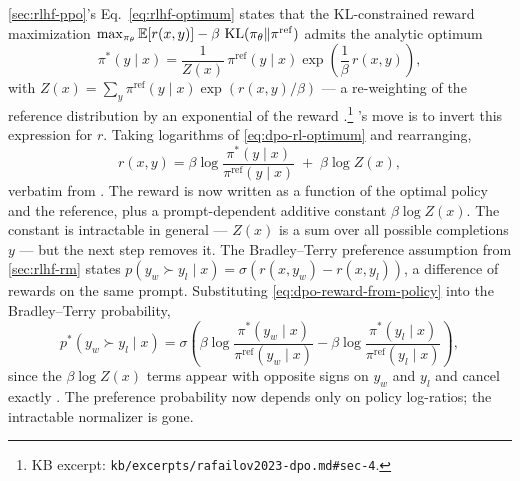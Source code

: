 \cref{sec:rlhf-ppo}'s Eq.~\cref{eq:rlhf-optimum} states that the
KL-constrained reward maximization
$\max_{\pi_\theta} \operatorname{\mathbb{E}}[r(x,y)] - \beta\,\operatorname{KL}(\pi_\theta \| \pi^{\mathrm{ref}})$
admits the analytic optimum
\begin{equation}
\pi^*(y \mid x)
  = \frac{1}{Z(x)} \, \pi^{\mathrm{ref}}(y \mid x)
    \exp\!\left(\frac{1}{\beta}\, r(x, y)\right),
\label{eq:dpo-rl-optimum}
\end{equation}
with $Z(x) = \sum_y \pi^{\mathrm{ref}}(y \mid x) \exp(r(x,y)/\beta)$ ---
a re-weighting of the reference distribution by an exponential of the
reward \citep[\S 4, Eq.~4]{rafailov2023-dpo}.\footnote{KB excerpt:
\nolinkurl{kb/excerpts/rafailov2023-dpo.md#sec-4}.} \citet{rafailov2023-dpo}'s
move is to invert this expression for $r$. Taking logarithms of
\cref{eq:dpo-rl-optimum} and rearranging,
\begin{equation}
r(x, y)
  = \beta \log \frac{\pi^*(y \mid x)}{\pi^{\mathrm{ref}}(y \mid x)}
    \;+\; \beta \log Z(x),
\label{eq:dpo-reward-from-policy}
\end{equation}
verbatim from \citet[\S 4, Eq.~5]{rafailov2023-dpo}. The reward is now
written as a function of the optimal policy and the reference, plus a
prompt-dependent additive constant $\beta \log Z(x)$. The constant is
intractable in general --- $Z(x)$ is a sum over all possible
completions $y$ --- but the next step removes it. The Bradley--Terry
preference assumption from \cref{sec:rlhf-rm} states
$p(y_w \succ y_l \mid x) = \sigma(r(x, y_w) - r(x, y_l))$, a difference
of rewards on the same prompt. Substituting
\cref{eq:dpo-reward-from-policy} into the Bradley--Terry probability,
\begin{equation}
p^*(y_w \succ y_l \mid x)
  = \sigma\!\left(
       \beta \log \frac{\pi^*(y_w \mid x)}{\pi^{\mathrm{ref}}(y_w \mid x)}
       - \beta \log \frac{\pi^*(y_l \mid x)}{\pi^{\mathrm{ref}}(y_l \mid x)}
     \right),
\label{eq:dpo-bt-pref}
\end{equation}
since the $\beta \log Z(x)$ terms appear with opposite signs on $y_w$
and $y_l$ and cancel exactly \citep[\S 4, Eq.~6]{rafailov2023-dpo}.
The preference probability now depends only on policy log-ratios; the
intractable normalizer is gone.

